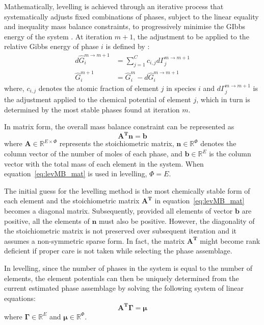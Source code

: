 	Mathematically, levelling is achieved through an iterative process that systematically adjusts fixed combinations of phases, subject to the linear equality and inequality mass balance constraints, to progressively minimise the GIbbs energy of the system \cite{Piro12a}. At iteration $m+1$, the adjustment to be applied to the relative Gibbs energy of phase $i$ is defined by \cite{Eriksson89}:
	\begin{equation} \label{eq:lev_adj}
		\begin{aligned}
			d \hat{G}_i^{m\rightarrow m+1} &= \sum_{j=1}^{C} c_{i,j} d \Gamma_j^{m\rightarrow m+1}\\
			\hat{G}_i^{m+1} &= \hat{G}_i^{m} - d \hat{G}_i^{m\rightarrow m+1}
		\end{aligned}
	\end{equation}
	where, $c_{i,j}$ denotes the atomic fraction of element $j$ in species $i$ and $d \Gamma_j^{m\rightarrow m+1}$ is the adjustment applied to the chemical potential of element $j$, which in turn is determined by the most stable phases found at iteration $m$.

	In  matrix form, the overall mass balance constraint can be represented as \cite{Piro12a}
	\begin{equation} \label{eq:levMB_mat}
		\mathbf{A^T} \mathbf{n}= \mathbf{b}
	\end{equation}
	where $\mathbf{A} \in \mathbb{R}^{E \times \Phi}$ represents the stoichiometric matrix, $\mathbf{n} \in \mathbb{R}^{\Phi }$ denotes the column vector of the number of moles of each phase, and $\mathbf{b} \in \mathbb{R}^{E}$ is the column vector with the total mass of each element in the system. When equation~\ref{eq:levMB_mat} is used in levelling, $\Phi = E$.

	The initial guess for the levelling method is the most chemically stable form of each element and the stoichiometric matrix $\mathbf{A^T}$ in equation~\eqref{eq:levMB_mat} becomes a diagonal matrix. Subsequently, provided all elements of vector $\mathbf{b}$ are positive, all the elements of $\mathbf{n}$ must also be positive. However, the diagonality of the stoichiometric matrix is not preserved over subsequent iteration and it assumes a non-symmetric sparse form. In fact, the matrix $\mathbf{A^T}$ might become rank deficient if proper care is not taken while selecting the phase assemblage.

	In levelling, since the number of phases in the system is equal to the number of elements, the element potentials can then be uniquely determined from the current estimated phase assemblage by solving the following system of linear equations:
	\begin{equation} \label{eq:levEP_mat}
		\mathbf{A^T} \boldsymbol{\Gamma} = \boldsymbol{\mu}
	\end{equation}
	where $\boldsymbol{\Gamma} \in \mathbb{R}^{E} $ and $\boldsymbol{\mu} \in \mathbb{R}^{\Phi}$.

